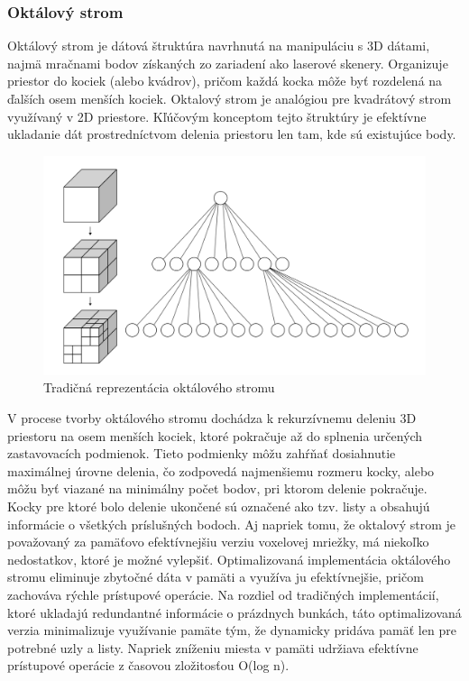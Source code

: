 \subsubsection{Oktálový strom}
\noindent Oktálový strom je dátová štruktúra navrhnutá na manipuláciu s 3D dátami, najmä mračnami bodov získaných zo zariadení ako laserové skenery. Organizuje priestor do kociek (alebo kvádrov), pričom každá kocka môže byť rozdelená na ďalších osem menších kociek. Oktalový strom je analógiou pre kvadrátový strom využívaný v 2D priestore. Kľúčovým konceptom tejto štruktúry je efektívne ukladanie dát prostredníctvom delenia priestoru len tam, kde sú existujúce body. \cite{oct_tree} 
\newline\begin{figure}[!htbp]
  \centering
  \includegraphics[width=12cm]{img/octree_full.png}
  \caption{Tradičná reprezentácia oktálového stromu \cite{oct_tree_img}}
  \label{vzhladobr}
\end{figure}
\newline\indent V procese tvorby oktálového stromu dochádza k rekurzívnemu deleniu 3D priestoru na osem menších kociek, ktoré pokračuje až do splnenia určených zastavovacích podmienok. Tieto podmienky môžu zahŕňať dosiahnutie maximálnej úrovne delenia, čo zodpovedá najmenšiemu rozmeru kocky, alebo môžu byť viazané na minimálny počet bodov, pri ktorom delenie pokračuje. Kocky pre ktoré bolo delenie ukončené sú označené ako tzv. listy a obsahujú informácie o všetkých príslušných bodoch. \cite{oct_tree}
\newline\indent Aj napriek tomu, že oktalový strom je považovaný za pamäťovo efektívnejšiu verziu voxelovej mriežky, má niekoľko nedostatkov, ktoré je možné vylepšiť. Optimalizovaná implementácia oktálového stromu eliminuje zbytočné dáta v pamäti a využíva ju efektívnejšie, pričom zachováva rýchle prístupové operácie. Na rozdiel od tradičných implementácií, ktoré ukladajú redundantné informácie o prázdnych bunkách, táto optimalizovaná verzia minimalizuje využívanie pamäte tým, že dynamicky pridáva pamäť len pre potrebné uzly a listy. Napriek zníženiu miesta v pamäti udržiava efektívne prístupové operácie z časovou zložitosťou O(log n). \cite{oct_tree}
